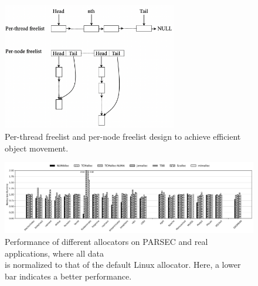 \begin{figure}[!h]
\centering
\includegraphics[width=3in]{figure/efficient-movement.png}
\caption{Per-thread freelist and per-node freelist design to achieve efficient object movement.\label{fig:perthreadlist}}
\end{figure}

\begin{figure}[!ht]
    \centering
    \includegraphics[width=7in]{figure/8-node-parsec-perf.jpg}
    \caption{Performance of different allocators on PARSEC and real applications, where all data\\ is normalized to that of the default Linux allocator. Here, a lower bar indicates a better performance.
    \label{fig:perf1}}
 \end{figure}

